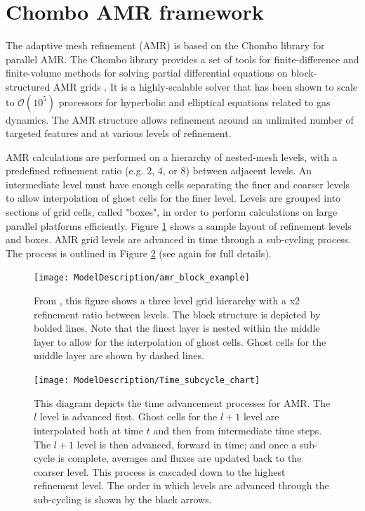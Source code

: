 \section{Chombo AMR framework}
The adaptive mesh refinement (AMR) is based on the Chombo library for parallel AMR.   The Chombo library provides a set of tools for finite-difference and finite-volume methods for solving partial differential equations on block-structured AMR grids \citep{colella2000chombo}.  It is a highly-scalable solver that has been shown to scale to $\mathcal{O}(10^{5})$  processors for hyperbolic and elliptical equations related to gas dynamics.    The AMR structure allows refinement around an unlimited number of targeted features and at various levels of refinement. 
   
    AMR calculations are performed on a hierarchy of nested-mesh levels, with a predefined refinement ratio (e.g. 2, 4, or 8) between adjacent levels.  An intermediate level must have enough cells separating the finer and coarser levels to allow interpolation of ghost cells for the finer level.  Levels are grouped into sections of grid cells, called "boxes", in order to perform calculations on large parallel platforms efficiently.  Figure \ref{fig:test1} shows a sample layout of refinement levels and boxes.  AMR grid levels are advanced in time through a sub-cycling process.  The process is outlined in Figure \ref{fig:timesubcycle} (see \cite{McCorquodale:2014rw} again for full details).
        \begin{figure}[h]
 		\centering
  		\texttt{[image: ModelDescription/amr\_block\_example]}
  		\caption{From \cite{GuzikETAL:2013}, this figure shows a three level grid hierarchy with a x2 refinement ratio between levels.  The block structure is depicted by bolded lines.  Note that the finest layer is nested within the middle layer to allow for the interpolation of ghost cells.  Ghost cells for the middle layer are shown by dashed lines.}
  		\label{fig:test1}
	\end{figure}
	
	\begin{figure}[h]
 		\centering
  		\texttt{[image: ModelDescription/Time\_subcycle\_chart]}
  		\caption{This diagram depicts the time advancement processes for AMR. The $l$ level is advanced first.  Ghost cells for the $l+1$ level are interpolated both at time $t$ and then from intermediate time steps. The $l+1$ level is then advanced, forward in time; and once a sub-cycle is complete, averages and fluxes are updated back to the coarser level.  This process is cascaded down to the highest refinement level.  The order in which levels are advanced through the sub-cycling is shown by the black arrows.}
 		 \label{fig:timesubcycle}
	\end{figure}
    
